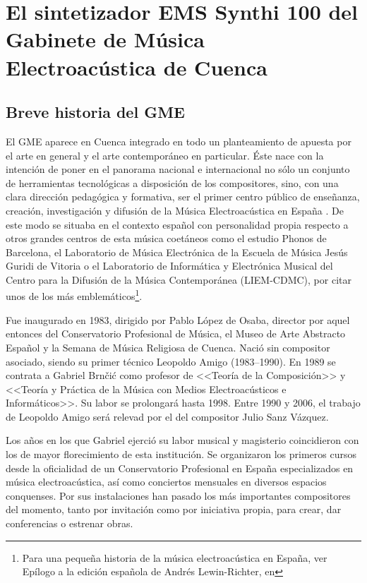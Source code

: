 \chapter[El Synthi 100 del GME de Cuenca]{El sintetizador EMS Synthi 100 del Gabinete de Música Electroacústica de Cuenca}


\section{Breve historia del GME}

El GME aparece en Cuenca integrado en todo un planteamiento de apuesta por el arte en general y el arte contemporáneo en particular. Éste nace con la intención de poner en el panorama nacional e internacional no sólo un conjunto de herramientas tecnológicas a disposición de los compositores, sino, con una clara dirección pedagógica y formativa, ser el primer centro público de enseñanza, creación, investigación y difusión de la Música Electroacústica en España \cite[p.~317]{GME}. De este modo se situaba en el contexto español con personalidad propia respecto a otros grandes centros de esta música coetáneos como el estudio Phonos de Barcelona, el Laboratorio de Música Electrónica de la Escuela de Música Jesús Guridi de Vitoria o el Laboratorio de Informática y Electrónica Musical del Centro para la Difusión de la Música Contemporánea (LIEM-CDMC), por citar unos de los más emblemáticos\footnote{Para una pequeña historia de la música electroacústica en España, ver Epílogo a la edición española de Andrés Lewin-Richter, en }.

Fue inaugurado en 1983, dirigido por Pablo López de Osaba, director por aquel entonces del Conservatorio Profesional de Música, el Museo de Arte Abstracto Español y la Semana de Música Religiosa de Cuenca. Nació sin compositor asociado, siendo su primer técnico Leopoldo Amigo (1983--1990). En 1989 se contrata a Gabriel Brnčić como profesor de <<Teoría de la Composición>> y <<Teoría y Práctica de la Música con Medios Electroacústicos e Informáticos>>. Su labor se prolongará hasta 1998. Entre 1990 y 2006, el trabajo de Leopoldo Amigo será relevad por el del compositor Julio Sanz Vázquez. 

Los años en los que Gabriel ejerció su labor musical y magisterio coincidieron con los de mayor florecimiento de esta institución. Se organizaron los primeros cursos desde la oficialidad de un Conservatorio Profesional en España especializados en música electroacústica, así como conciertos mensuales en diversos espacios conquenses. Por sus instalaciones han pasado los más importantes compositores del momento, tanto por invitación como por iniciativa propia, para crear, dar conferencias o estrenar obras.

